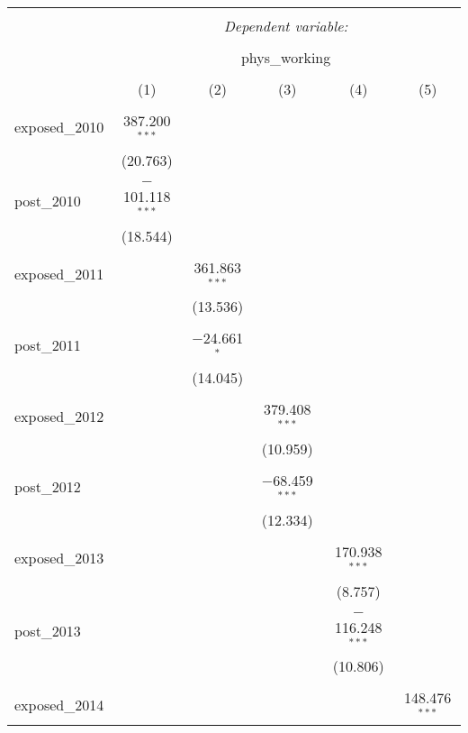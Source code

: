 
\begin{table}[!htbp] \centering 
  \caption{} 
  \label{} 
\begin{tabular}{@{\extracolsep{5pt}}lccccc} 
\\[-1.8ex]\hline 
\hline \\[-1.8ex] 
 & \multicolumn{5}{c}{\textit{Dependent variable:}} \\ 
\cline{2-6} 
\\[-1.8ex] & \multicolumn{5}{c}{phys\_working} \\ 
\\[-1.8ex] & (1) & (2) & (3) & (4) & (5)\\ 
\hline \\[-1.8ex] 
 exposed\_2010 & 387.200$^{***}$ &  &  &  &  \\ 
  & (20.763) &  &  &  &  \\ 
  & & & & & \\ 
 post\_2010 & $-$101.118$^{***}$ &  &  &  &  \\ 
  & (18.544) &  &  &  &  \\ 
  & & & & & \\ 
 exposed\_2011 &  & 361.863$^{***}$ &  &  &  \\ 
  &  & (13.536) &  &  &  \\ 
  & & & & & \\ 
 post\_2011 &  & $-$24.661$^{*}$ &  &  &  \\ 
  &  & (14.045) &  &  &  \\ 
  & & & & & \\ 
 exposed\_2012 &  &  & 379.408$^{***}$ &  &  \\ 
  &  &  & (10.959) &  &  \\ 
  & & & & & \\ 
 post\_2012 &  &  & $-$68.459$^{***}$ &  &  \\ 
  &  &  & (12.334) &  &  \\ 
  & & & & & \\ 
 exposed\_2013 &  &  &  & 170.938$^{***}$ &  \\ 
  &  &  &  & (8.757) &  \\ 
  & & & & & \\ 
 post\_2013 &  &  &  & $-$116.248$^{***}$ &  \\ 
  &  &  &  & (10.806) &  \\ 
  & & & & & \\ 
 exposed\_2014 &  &  &  &  & 148.476$^{***}$ \\ 

\end{tabular}
\end{table}
